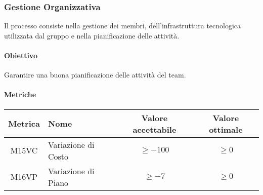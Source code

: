 \subsubsection{Gestione Organizzativa}
Il processo consiste nella gestione dei membri, dell'infrastruttura tecnologica utilizzata 
dal gruppo e nella pianificazione delle attività.
\paragraph{Obiettivo} \hfill \break
Garantire una buona pianificazione delle attività del team.

\paragraph{Metriche}
\begin{center}
    \renewcommand{\arraystretch}{1.8}
    \begin{tabular}{ |c|m{12em}|c|c|}
        \hline
        \textbf{Metrica} & \textbf{Nome} & \textbf{Valore accettabile} & \textbf{Valore ottimale} \\
        \hline
        M15VC & Variazione di Costo & $ \geq -100 $ & $ \geq 0 $  \\
        \hline
        M16VP & Variazione di Piano & $ \geq -7 $ & $ \geq 0 $\\
        \hline
    \end{tabular}
\end{center}
